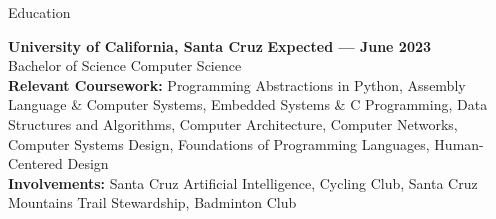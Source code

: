 \documentclass{resume}
\begin{document}
\begin{rSection}{\large Education}

{\bf University of California, Santa Cruz} \hfill {\bf{Expected --- June 2023}}
\\ Bachelor of Science Computer Science\hfill %
  \\ \textbf{Relevant Coursework:} Programming Abstractions in Python, Assembly Language \& Computer Systems, Embedded Systems \& C Programming, Data Structures and Algorithms, Computer Architecture, Computer Networks, Computer Systems Design, Foundations of Programming Languages, Human-Centered Design
\\ \textbf{Involvements:}  Santa Cruz Artificial Intelligence, Cycling Club, Santa Cruz Mountains Trail Stewardship, Badminton Club

\end{rSection}
\end{document}
